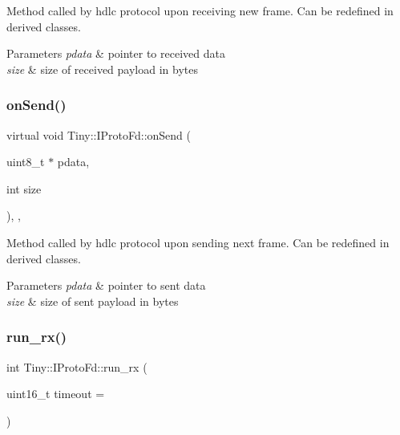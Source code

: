 Method called by hdlc protocol upon receiving new frame. Can be redefined in derived classes. 
\begin{DoxyParams}{Parameters}
{\em pdata} & pointer to received data \\
\hline
{\em size} & size of received payload in bytes \\
\hline
\end{DoxyParams}
\mbox{\label{classTiny_1_1IProtoFd_acd324920c1f35d378fb5153b51cd6561}} 
\subsubsection{\texorpdfstring{on\+Send()}{onSend()}}
{\footnotesize\ttfamily virtual void Tiny\+::\+I\+Proto\+Fd\+::on\+Send (\begin{DoxyParamCaption}\item[{uint8\+\_\+t $\ast$}]{pdata,  }\item[{int}]{size }\end{DoxyParamCaption})\hspace{0.3cm}{\ttfamily [inline]}, {\ttfamily [protected]}, {\ttfamily [virtual]}}

Method called by hdlc protocol upon sending next frame. Can be redefined in derived classes. 
\begin{DoxyParams}{Parameters}
{\em pdata} & pointer to sent data \\
\hline
{\em size} & size of sent payload in bytes \\
\hline
\end{DoxyParams}
\mbox{\label{classTiny_1_1IProtoFd_a37292eb5c9faf1be8c4850985e0ae2eb}} 
\subsubsection{\texorpdfstring{run\+\_\+rx()}{run\_rx()}\hspace{0.1cm}{\footnotesize\ttfamily [1/2]}}
{\footnotesize\ttfamily int Tiny\+::\+I\+Proto\+Fd\+::run\+\_\+rx (\begin{DoxyParamCaption}\item[{uint16\+\_\+t}]{timeout = {} }\end{DoxyParamCaption})}

